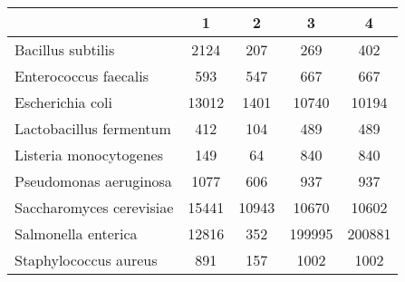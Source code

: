 \begin{adjustbox}{center}
\begin{tabular}{|l||c|c|c|c|}
\hline
& 1 & 2 & 3 & 4 \\
\hline
\hline
Bacillus subtilis & \cellcolor[RGB]{235, 71, 71} 2124 & \cellcolor[RGB]{227, 227, 252} 207 & \cellcolor[RGB]{241, 241, 253} 269 & \cellcolor[RGB]{253, 237, 237} 402 \\
\hline
Enterococcus faecalis & \cellcolor[RGB]{241, 241, 253} 593 & \cellcolor[RGB]{227, 227, 252} 547 & \cellcolor[RGB]{253, 241, 241} 667 & \cellcolor[RGB]{253, 241, 241} 667 \\
\hline
Escherichia coli & \cellcolor[RGB]{253, 237, 237} 13012 & \cellcolor[RGB]{218, 218, 251} 1401 & \cellcolor[RGB]{255, 255, 255} 10740 & \cellcolor[RGB]{255, 255, 255} 10194 \\
\hline
Lactobacillus fermentum & \cellcolor[RGB]{250, 250, 254} 412 & \cellcolor[RGB]{223, 223, 251} 104 & \cellcolor[RGB]{254, 250, 250} 489 & \cellcolor[RGB]{254, 250, 250} 489 \\
\hline
Listeria monocytogenes & \cellcolor[RGB]{237, 237, 253} 149 & \cellcolor[RGB]{232, 232, 252} 64 & \cellcolor[RGB]{252, 232, 232} 840 & \cellcolor[RGB]{252, 232, 232} 840 \\
\hline
Pseudomonas aeruginosa & \cellcolor[RGB]{252, 227, 227} 1077 & \cellcolor[RGB]{218, 218, 251} 606 & \cellcolor[RGB]{255, 255, 255} 937 & \cellcolor[RGB]{255, 255, 255} 937 \\
\hline
Saccharomyces cerevisiae & \cellcolor[RGB]{235, 71, 71} 15441 & \cellcolor[RGB]{253, 237, 237} 10943 & \cellcolor[RGB]{237, 237, 253} 10670 & \cellcolor[RGB]{227, 227, 252} 10602 \\
\hline
Salmonella enterica & \cellcolor[RGB]{232, 232, 252} 12816 & \cellcolor[RGB]{232, 232, 252} 352 & \cellcolor[RGB]{252, 232, 232} 199995 & \cellcolor[RGB]{252, 232, 232} 200881 \\
\hline
Staphylococcus aureus & \cellcolor[RGB]{250, 250, 254} 891 & \cellcolor[RGB]{218, 218, 251} 157 & \cellcolor[RGB]{254, 250, 250} 1002 & \cellcolor[RGB]{254, 250, 250} 1002 \\
\hline
\end{tabular}
\end{adjustbox}
